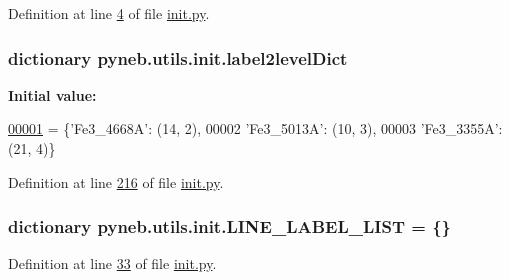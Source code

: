 Definition at line \hyperlink{init_8py_source_l00004}{4} of file \hyperlink{init_8py_source}{init.\+py}.

\hypertarget{namespacepyneb_1_1utils_1_1init_a7dacd254fb434e414b2792c54049616c}{}
\subsubsection[{label2level\+Dict}]{\setlength{\rightskip}{0pt plus 5cm}dictionary pyneb.\+utils.\+init.\+label2level\+Dict}\label{namespacepyneb_1_1utils_1_1init_a7dacd254fb434e414b2792c54049616c}
{\bfseries Initial value\+:}
\begin{DoxyCode}
\hypertarget{namespacepyneb_1_1utils_1_1init_l00001}{}\hyperlink{namespacepyneb_1_1utils_1_1init}{00001} = \{\textcolor{stringliteral}{'Fe3\_4668A'}: (14, 2), 
00002                    \textcolor{stringliteral}{'Fe3\_5013A'}: (10, 3),
00003                    \textcolor{stringliteral}{'Fe3\_3355A'}: (21, 4)\}
\end{DoxyCode}


Definition at line \hyperlink{init_8py_source_l00216}{216} of file \hyperlink{init_8py_source}{init.\+py}.

\hypertarget{namespacepyneb_1_1utils_1_1init_a2db1385e0dfb34bdc19ec2e7491041b3}{}
\subsubsection[{L\+I\+N\+E\+\_\+\+L\+A\+B\+E\+L\+\_\+\+L\+I\+S\+T}]{\setlength{\rightskip}{0pt plus 5cm}dictionary pyneb.\+utils.\+init.\+L\+I\+N\+E\+\_\+\+L\+A\+B\+E\+L\+\_\+\+L\+I\+S\+T = \{\}}\label{namespacepyneb_1_1utils_1_1init_a2db1385e0dfb34bdc19ec2e7491041b3}


Definition at line \hyperlink{init_8py_source_l00033}{33} of file \hyperlink{init_8py_source}{init.\+py}.

\hypertarget{namespacepyneb_1_1utils_1_1init_aae3ff006599d45be21cb0b2753f14802}{}
